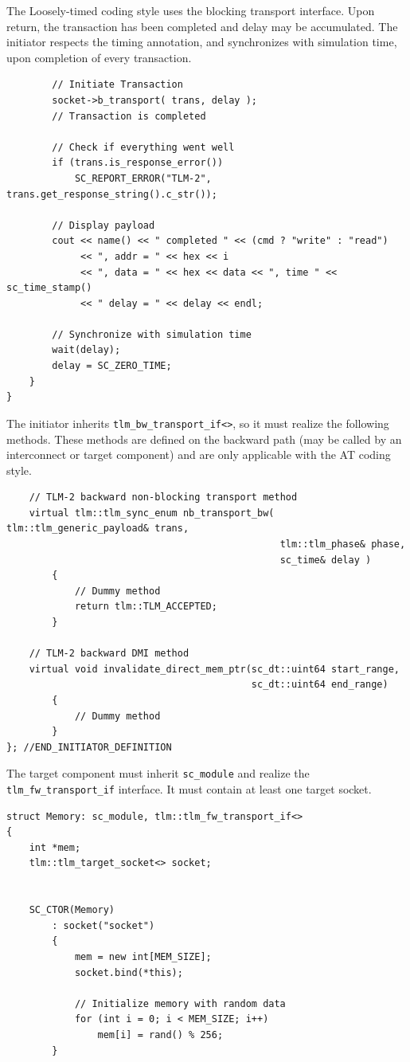 \documentclass[11pt]{article}
\begin{document}
The Loosely-timed coding style uses the blocking transport interface.
Upon return, the transaction has been completed and delay may be accumulated.
The initiator respects the timing annotation, and synchronizes with simulation time, upon completion of every transaction.
\begin{verbatim}
        // Initiate Transaction
        socket->b_transport( trans, delay );
        // Transaction is completed

        // Check if everything went well
        if (trans.is_response_error())
            SC_REPORT_ERROR("TLM-2", trans.get_response_string().c_str());

        // Display payload
        cout << name() << " completed " << (cmd ? "write" : "read") 
             << ", addr = " << hex << i
             << ", data = " << hex << data << ", time " << sc_time_stamp()
             << " delay = " << delay << endl;

        // Synchronize with simulation time
        wait(delay);
        delay = SC_ZERO_TIME;
    }
}
\end{verbatim}
The initiator inherits \texttt{tlm\_bw\_transport\_if<>}, so it must realize the following methods.
These methods are defined on the backward path (may be called by an interconnect or target component) and are only applicable with the AT coding style.
\begin{verbatim}
    // TLM-2 backward non-blocking transport method
    virtual tlm::tlm_sync_enum nb_transport_bw( tlm::tlm_generic_payload& trans,
                                                tlm::tlm_phase& phase, 
                                                sc_time& delay )
        {
            // Dummy method
            return tlm::TLM_ACCEPTED;
        }

    // TLM-2 backward DMI method
    virtual void invalidate_direct_mem_ptr(sc_dt::uint64 start_range,
                                           sc_dt::uint64 end_range)
        {
            // Dummy method
        }
}; //END_INITIATOR_DEFINITION
\end{verbatim}
The target component must inherit \texttt{sc\_module} and realize the \texttt{tlm\_fw\_transport\_if} interface.
It must contain at least one target socket.
\begin{verbatim}
struct Memory: sc_module, tlm::tlm_fw_transport_if<>
{
    int *mem;
    tlm::tlm_target_socket<> socket;


    SC_CTOR(Memory)
        : socket("socket")
        {
            mem = new int[MEM_SIZE];
            socket.bind(*this);

            // Initialize memory with random data
            for (int i = 0; i < MEM_SIZE; i++)
                mem[i] = rand() % 256;
        }
\end{verbatim}
\end{document}
